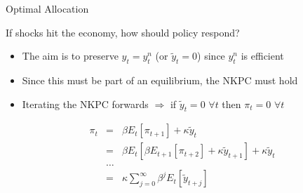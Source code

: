 
	
\begin{frame}{Optimal Allocation}

If shocks hit the economy, how should policy respond?
\begin{itemize}
\item	The aim is to preserve $y_{t} = y^{n}_{t}$ (or $\tilde{y}_{t}=0$) since $y_{t}^{n}$ is efficient
\item	Since this must be part of an equilibrium, the NKPC must hold
\item	Iterating the NKPC forwards $\Rightarrow$ if $ \tilde{y}_{t}=0$ $\forall t$ then $\pi_{t}=0$ $\forall t$
\end{itemize}
\begin{eqnarray*}
\pi_{t} 	&=& \beta E_{t}[\pi_{t+1}] + \kappa \tilde{y}_{t}	\\
		&=& \beta E_{t}[ \beta E_{t+1}[\pi_{t+2}] + \kappa \tilde{y}_{t+1}] + \kappa \tilde{y}_{t} \\
		&\ldots&	\\
		&=& \kappa \sum\limits_{j=0}^{\infty} \beta^{j} E_{t}[\tilde{y}_{t+j}]
\end{eqnarray*}

\end{frame}


	
